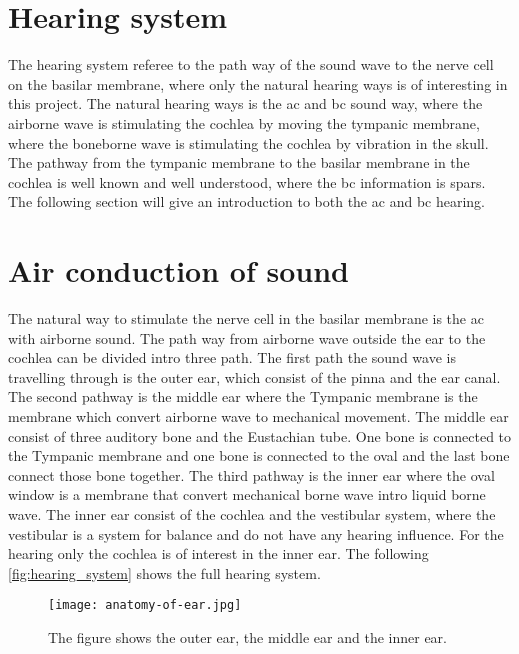 \section{Hearing system}
The hearing system referee to the path way of the sound wave to the nerve cell on the basilar membrane, where only the natural hearing ways is of interesting in this project. The natural hearing ways is the \gls{ac} and \gls{bc} sound way, where the airborne wave is stimulating the cochlea by moving the tympanic membrane, where the boneborne wave is stimulating the cochlea by vibration in the skull. The pathway from the tympanic membrane to the basilar membrane in the cochlea is well known and well understood, where the \gls{bc} information is spars. The following section will give an introduction to both the \gls{ac} and \gls{bc} hearing.


\section{Air conduction of sound}
The natural way to stimulate the nerve cell in the basilar membrane is the \gls{ac} with airborne sound. The path way from airborne wave outside the ear to the cochlea can be divided intro three path. The first path the sound wave is travelling through is the outer ear, which consist of the pinna and the ear canal. The second pathway is the middle ear where the Tympanic membrane is the membrane which convert airborne wave to mechanical movement. The middle ear consist of three auditory bone and the Eustachian tube. One bone is connected to the Tympanic membrane and one bone is connected to the oval and the last bone connect those bone together. The third pathway is the inner ear where the oval window is a membrane that convert mechanical borne wave intro liquid borne wave. The inner ear consist of the cochlea and the vestibular system, where the vestibular is a system for balance and do not have any hearing influence. For the hearing only the cochlea is of interest in the inner ear. The following \autoref{fig:hearing_system} shows the full hearing system.


 \begin{figure}[H]
	\centering
		\texttt{[image: anatomy-of-ear.jpg]}
		\caption{The figure shows the outer ear, the middle ear and the inner ear.}
		\label{fig:hearing_system}
\end{figure}


